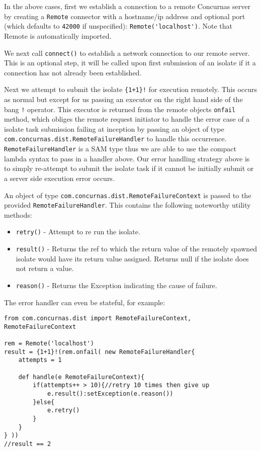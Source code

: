 \documentclass[conc-doc]{subfiles}
\begin{document}
In the above cases, first we establish a connection to a remote Concurnas server by creating a \lstinline{Remote} connector with a hostname/ip address and optional port (which defaults to \lstinline{42000} if unspecified): \lstinline{Remote('localhost')}. Note that Remote is automatically imported.

We next call \lstinline{connect()} to establish a network connection to our remote server. This is an optional step, it will be called upon first submission of an isolate if it a connection has not already been established.

Next we attempt to submit the isolate \lstinline!{1+1}!\lstinline{!} for execution remotely. This occurs as normal but except for us passing an executor on the right hand side of the bang \lstinline{!} operator. This executor is returned from the remote objects \lstinline{onfail} method, which obliges the remote request initiator to handle the error case of a isolate task submission failing at inception by passing an object of type \lstinline{com.concurnas.dist.RemoteFailureHandler} to handle this occurrence. \lstinline{RemoteFailureHandler} is a SAM type thus we are able to use the compact lambda syntax to pass in a handler above. Our error handling strategy above is to simply re-attempt to submit the isolate task if it cannot be initially submit or a server side execution error occurs.

An object of type \lstinline{com.concurnas.dist.RemoteFailureContext} is passed to the provided \lstinline{RemoteFailureHandler}. This contains the following noteworthy utility methods:

\begin{itemize}
	\item \lstinline{retry()} - Attempt to re run the isolate.
	\item \lstinline{result()} - Returns the ref to which the return value of the remotely spawned isolate would have its return value assigned. Returns null if the isolate does not return a value.
	\item \lstinline{reason()} - Returns the Exception indicating the cause of failure.
\end{itemize}

The error handler can even be stateful, for example:
\begin{lstlisting}
from com.concurnas.dist import RemoteFailureContext, RemoteFailureContext

rem = Remote('localhost')
result = {1+1}!(rem.onfail( new RemoteFailureHandler{  
	attempts = 1
	
	def handle(e RemoteFailureContext){
		if(attempts++ > 10){//retry 10 times then give up
			e.result():setException(e.reason())
		}else{
			e.retry()
		}
	}
} ))
//result == 2
\end{lstlisting}
\end{document}
